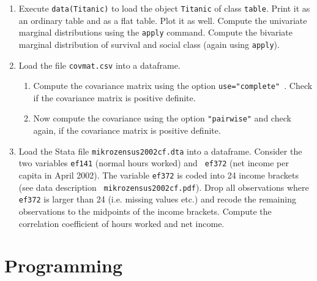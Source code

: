 \documentclass{article}
\begin{document}
\begin{enumerate}
\item Execute \texttt{data(Titanic)} to load the object \texttt{Titanic} of
class \texttt{table}. Print it as an ordinary table and as a flat table.
Plot it as well. Compute the univariate marginal distributions using the 
\texttt{apply} command. Compute the bivariate marginal distribution of
survival and social class (again using \texttt{apply}).

\item Load the file \texttt{covmat.csv} into a dataframe.

\begin{enumerate}
\item Compute the covariance matrix using the option \texttt{use="{}complete"%
}. Check if the covariance matrix is positive definite.

\item Now compute the covariance using the option \texttt{"{}pairwise"} and
check again, if the covariance matrix is positive definite.
\end{enumerate}

\item Load the Stata file \texttt{mikrozensus2002cf.dta} into a dataframe.
Consider the two variables \texttt{ef141} (normal hours worked) and \texttt{%
ef372} (net income per capita in April 2002). The variable \texttt{ef372} is
coded into 24 income brackets (see data description \texttt{%
mikrozensus2002cf.pdf}). Drop all observations where \texttt{ef372} is
larger than 24 (i.e. missing values etc.) and recode the remaining
observations to the midpoints of the income brackets. Compute the
correlation coefficient of hours worked and net income.
\end{enumerate}

\newpage


\section{Programming}
\end{document}
